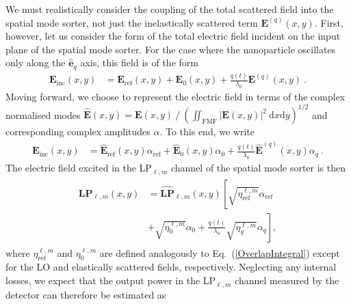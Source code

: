 \documentclass[%
 reprint,
 amsmath,amssymb,
 aps,
pra,
]{revtex4-2}
\begin{document}
\noindent We must realistically consider the coupling of the total scattered field into the spatial mode sorter, not just the inelastically scattered term $\boldsymbol{E}^{(q)}(x, y)$. First, however, let us consider the form of the total electric field incident on the input plane of the spatial mode sorter. For the case where the nanoparticle oscillates only along the $\hat{\boldsymbol{e}}_{q}$ axis, this field is of the form
\begin{align}
    \boldsymbol{E}_{\mathrm{inc}}(x, y) &= \boldsymbol{E}_{\mathrm{ref}}(x, y) + \boldsymbol{E}_{0}(x, y) + \frac{q(t)}{\lambda_{0}}\boldsymbol{E}^{(q)}(x, y) ~ .
\end{align}
Moving forward, we choose to represent the electric field in terms of the complex normalised modes ${\hat{\boldsymbol{E}}(x, y) = \boldsymbol{E}(x, y) ~ / ~ (\iint_{\mathrm{FMF}} |\boldsymbol{E}(x, y)|^{2} ~ \mathrm{d}x\mathrm{d}y)^{1/2}}$ and corresponding complex amplitudes $\alpha$. To this end, we write
\begin{align}
    \boldsymbol{E}_{\mathrm{inc}}(x, y) &= \hat{\boldsymbol{E}}_{\mathrm{ref}}(x, y)\alpha_{\mathrm{ref}} + \hat{\boldsymbol{E}}_{0}(x, y)\alpha_{0} + \frac{q(t)}{\lambda_{0}}\hat{\boldsymbol{E}}^{(q)}(x, y)\alpha_{q} ~.
\end{align}
The electric field excited in the LP$_{\ell,m}$ channel of the spatial mode sorter is then
\begin{align}
\begin{split}
    \textbf{LP}_{\ell,m}(x, y) &= \hat{\textbf{LP}}_{\ell,m}(x, y) \left[ \sqrt{\eta^{\ell,m}_{\mathrm{ref}}}\alpha_{\mathrm{ref}} \right. \\
    & \left. + \sqrt{\eta^{\ell,m}_{0}}\alpha_{0} + \frac{q(t)}{\lambda_{0}}\sqrt{\eta^{\ell,m}_{q}}\alpha_{q} \right],
\end{split}
\end{align}
where $\eta^{\ell,m}_{\mathrm{ref}}$ and $\eta^{\ell,m}_{0}$ are defined analogously to Eq.~(\ref{OverlapIntegral}) except for the LO and elastically scattered fields, respectively. Neglecting any internal losses, we expect that the output power in the LP$_{\ell,m}$ channel measured by the detector can therefore be estimated as
\end{document}

